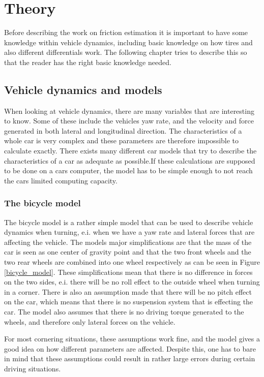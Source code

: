 \chapter{Theory}

Before describing the work on friction estimation it is important to have some knowledge within vehicle dynamics, including basic knowledge on how tires and also different differentials work. The following chapter tries to describe this so that the reader has the right basic knowledge needed.

\section{Vehicle dynamics and models}

When looking at vehicle dynamics, there are many variables that are interesting to know. Some of these include the vehicles yaw rate, and the velocity and force generated in both lateral and longitudinal direction. The characteristics of a whole car is very complex and these parameters are therefore impossible to calculate exactly. There exists many different car models that try to describe the characteristics of a car as adequate as possible.If these calculations are supposed to be done on a cars computer, the model has to be simple enough to not reach the cars limited computing capacity.

\subsection{The bicycle model}

The bicycle model is a rather simple model that can be used to describe vehicle dynamics when turning, e.i. when we have a yaw rate and lateral forces that are affecting the vehicle. The models major simplifications are that the mass of the car is seen as one center of gravity point and that the two front wheels and the two rear wheels are combined into one wheel respectively as can be seen in Figure \ref{bicycle_model}. These simplifications mean that there is no difference in forces on the two sides, e.i. there will be no roll effect to the outside wheel when turning in a corner. There is also an assumption made that there will be no pitch effect on the car, which means that there is no suspension system that is effecting the car. The model also assumes that there is no driving torque generated to the wheels, and therefore only lateral forces on the vehicle.

For most cornering situations, these assumptions work fine, and the model gives a good idea on how different parameters are affected. Despite this, one has to bare in mind that these assumptions could result in rather large errors during certain driving situations.

